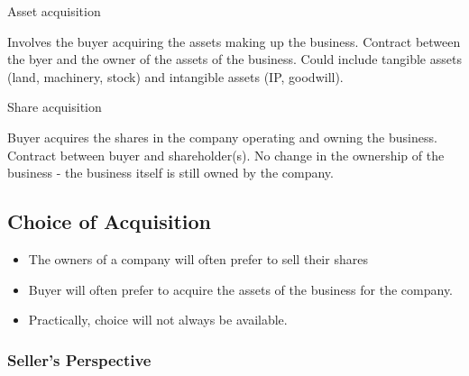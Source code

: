 \documentclass[
]{article}
\providecommand{\tightlist}{%
  \setlength{\itemsep}{0pt}\setlength{\parskip}{0pt}}
\newenvironment{env-5a3c61ab-a17d-4615-b6cf-88edddd444fd}
{
    \savenotes\tcolorbox[blanker,breakable,left=5pt,borderline west={2pt}{-4pt}{gold}]
}
{
    \endtcolorbox\spewnotes
}
\begin{document}
\begin{env-5a3c61ab-a17d-4615-b6cf-88edddd444fd}

Asset acquisition

Involves the buyer acquiring the assets making up the business. Contract
between the byer and the owner of the assets of the business. Could
include tangible assets (land, machinery, stock) and intangible assets
(IP, goodwill).

\end{env-5a3c61ab-a17d-4615-b6cf-88edddd444fd}

\begin{env-5a3c61ab-a17d-4615-b6cf-88edddd444fd}

Share acquisition

Buyer acquires the shares in the company operating and owning the
business. Contract between buyer and shareholder(s). No change in the
ownership of the business - the business itself is still owned by the
company.

\end{env-5a3c61ab-a17d-4615-b6cf-88edddd444fd}

\hypertarget{choice-of-acquisition}{%
\subsection{Choice of Acquisition}\label{choice-of-acquisition}}

\begin{itemize}
\tightlist
\item
  The owners of a company will often prefer to sell their shares
\item
  Buyer will often prefer to acquire the assets of the business for the
  company.
\item
  Practically, choice will not always be available.
\end{itemize}

\hypertarget{sellers-perspective}{%
\subsubsection{Seller's Perspective}\label{sellers-perspective}}
\end{document}
